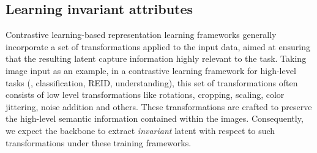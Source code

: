 
\subsection{Learning invariant attributes}

Contrastive learning-based representation learning frameworks generally incorporate a set of transformations applied to the input data, aimed at ensuring that the resulting latent capture information highly relevant to the task. Taking image input as an example, in a contrastive learning framework for high-level tasks (\eg, classification, REID, understanding), this set of transformations often consists of low level transformations like rotations, cropping, scaling, color jittering, noise addition and others. These transformations are crafted to preserve the high-level semantic information contained within the images. Consequently, we expect the backbone to extract \emph{invariant} latent with respect to such transformations under these training frameworks.

